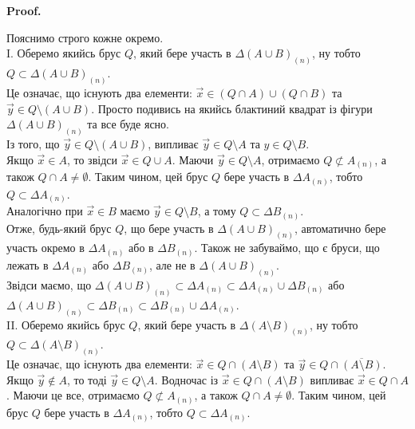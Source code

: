 \documentclass[a4paper, 10pt]{article}
\makeatletter
\def\qed{$\blacksquare$}
\theoremstyle{theoremdd}
\theoremstyle{theoremdd}
\theoremstyle{theoremdd}
\theoremstyle{theoremdd}
\theoremstyle{theoremdd}
\theoremstyle{theoremdd}
\theoremstyle{theoremdd}
\theoremstyle{theoremdd}
\renewenvironment{proof}[1][Proof.\\]{\par
\pushQED{\hfill \qed}%
\normalfont \topsep6\p@\@plus6\p@\relax
\trivlist
\item\relax
{\bfseries
#1\@addpunct{.}}\hspace\labelsep\ignorespaces
}{%
\popQED\endtrivlist\@endpefalse
}
\makeatother
\begin{document}
\begin{proof}
\begin{figure}[H]
\end{figure}
Пояснимо строго кожне окремо.\\
I. Оберемо якийсь брус $Q$, який бере участь в $\Delta (A \cup B)_{(n)}$, ну тобто $Q \subset \Delta (A \cup B)_{(n)}$.\\
Це означає, що існують два елементи: $\vec{x} \in (Q \cap A) \cup (Q \cap B)$ та $\vec{y} \in Q \setminus (A \cup B)$. Просто подивись на якийсь блактиний квадрат із фігури $\Delta (A \cup B)_{(n)}$ та все буде ясно.\\
Із того, що $\vec{y} \in Q \setminus (A \cup B)$, випливає $\vec{y} \in Q \setminus A$ та $y \in Q \setminus B$.\\
Якщо $\vec{x} \in A$, то звідси $\vec{x} \in Q \cup A$. Маючи $\vec{y} \in Q \setminus A$, отримаємо $Q \not\subset A_{(n)}$, а також $Q \cap A \neq \emptyset$. Таким чином, цей брус $Q$ бере участь в $\Delta A_{(n)}$, тобто $Q \subset \Delta A_{(n)}$.\\
Аналогічно при $\vec{x} \in B$ маємо $\vec{y} \in Q \setminus B$, а тому $Q \subset \Delta B_{(n)}$.\\
Отже, будь-який брус $Q$, що бере участь в $\Delta (A \cup B)_{(n)}$, автоматично бере участь окремо в $\Delta A_{(n)}$ або в $\Delta B_{(n)}$. Також не забуваймо, що є бруси, що лежать в $\Delta A_{(n)}$ або $\Delta B_{(n)}$, але не в $\Delta (A \cup B)_{(n)}$.\\
Звідси маємо, що $\Delta (A \cup B)_{(n)} \subset \Delta A_{(n)} \subset \Delta A_{(n)} \cup \Delta B_{(n)}$ або $\Delta (A \cup B)_{(n)} \subset \Delta B_{(n)} \subset \Delta B_{(n)} \cup \Delta A_{(n)}$.
\bigskip \\
II. Оберемо якийсь брус $Q$, який бере участь в $\Delta (A \setminus B)_{(n)}$, ну тобто $Q \subset \Delta (A \setminus B)_{(n)}$.\\
Це означає, що існують два елементи: $\vec{x} \in Q \cap (A \setminus B)$ та $\vec{y} \in Q \cap \overline{(A \setminus B)}$.\\
Якщо $\vec{y} \not\in A$, то тоді $\vec{y} \in Q \setminus A$. Водночас із $\vec{x} \in Q \cap (A \setminus B)$ випливає $\vec{x} \in Q \cap A$. Маючи це все, отримаємо $Q \not\subset A_{(n)}$, а також $Q \cap A \neq \emptyset$. Таким чином, цей брус $Q$ бере участь в $\Delta A_{(n)}$, тобто $Q \subset \Delta A_{(n)}$.\\

\end{proof}
\end{document}
